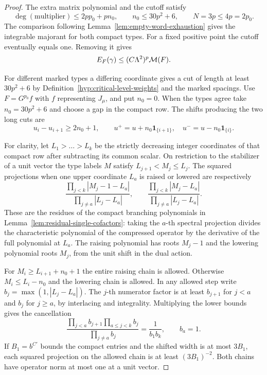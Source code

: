 \begin{proof}
The extra matrix polynomial and the cutoff satisfy
\[
 \deg(\text{multiplier})\le 2pp_0+pn_0,\qquad n_0\le30p^2+6,\qquad
                        N=3p\le4p=2p_0 .
\]
The comparison following Lemma~\ref{lem:empty-word-exhaustion}
gives the integrable majorant for both compact types. For a fixed positive
point the cutoff eventually equals one. Removing it gives
\[
                    E_F(\gamma)\le(C\Lambda^2)^p{\cal M}(F).
\]

For different marked types a differing coordinate gives a cut of
length at least \(30p^2+6\) by
Definition~\ref{hyp:critical-level-weights} and the marked spacings.
Use \(F=G^{p_0}f\) with \(f\) representing \(J_\mu\), and put
\(n_0=0\). When the types agree take \(n_0=30p^2+6\) and choose
a gap in the compact row. The shifts producing the two long cuts are
\[
        u_i-u_{i+1}\ge2n_0+1,\qquad
    u^+=u+n_0\mathbf1_{\{i+1\}},\quad u^-=u-n_0\mathbf1_{\{i\}} .
\]

For clarity, let \(L_1>\dots>L_k\) be the strictly decreasing integer
coordinates of that compact row after subtracting its common scalar.
On restriction to the stabilizer of a unit vector the type labels
\(M\) satisfy \(L_{j+1}<M_j\le L_j\). The squared projections when
one upper coordinate \(L_a\) is raised or lowered are respectively
\[
 \frac{\prod_{j<k}|M_j-1-L_a|}{\prod_{j\ne a}|L_j-L_a|},
 \qquad
 \frac{\prod_{j<k}|M_j-L_a|}{\prod_{j\ne a}|L_j-L_a|}.
\]
These are the residues of the compact branching polynomials in
Lemma~\ref{lem:residual-single-cofactors}: taking the \(a\)-th
spectral projection divides the characteristic polynomial of the
compressed operator by the derivative of the full polynomial at
\(L_a\). The raising polynomial has roots \(M_j-1\) and the lowering
polynomial roots \(M_j\), from the unit shift in the dual action.

For \(M_i\ge L_{i+1}+n_0+1\) the entire raising chain is allowed.
Otherwise \(M_i\le L_i-n_0\) and the lowering chain is allowed.
In any allowed step write \(b_j=\max(1,|L_j-L_a|)\).
The \(j\)-th numerator factor is at least \(b_{j+1}\) for \(j<a\)
and \(b_j\) for \(j\ge a\), by interlacing and integrality.
Multiplying the lower bounds gives the cancellation
\[
 \frac{\prod_{j<a}b_{j+1}\prod_{a\le j<k}b_j}
      {\prod_{j\ne a}b_j}
       =\frac{1}{b_1b_k},\qquad b_a=1 .
\]
If \(B_1=b^{C'}\) bounds the compact entries
and the shifted width is at most \(3B_1\), each squared projection
on the allowed chain is at least \((3B_1)^{-2}\).
Both chains have operator norm at most one at a unit vector.


\end{proof}
